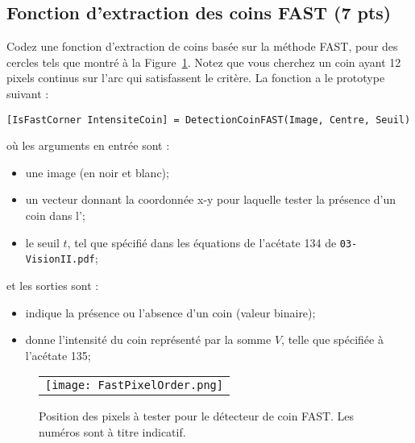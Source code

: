 \documentclass[12pt]{article}
\begin{document}
\subsection{Fonction d'extraction des coins FAST (7 pts)}
Codez une fonction d'extraction de coins basée sur la méthode FAST, pour des cercles tels que montré à la Figure~\ref{FastPixelOrder}. Notez que vous cherchez un coin ayant 12 pixels continus sur l'arc qui satisfassent le critère. La fonction a le prototype suivant :
\vspace{-0.22in}
\begin{lstlisting}
[IsFastCorner IntensiteCoin] = DetectionCoinFAST(Image, Centre, Seuil)
\end{lstlisting}
où les arguments en entrée sont :
\begin{itemize}
\item {} une image (en noir et blanc);
\item {} un vecteur donnant la coordonnée x-y pour laquelle tester la présence d'un coin dans l';
\item {} le seuil $t$, tel que spécifié dans les équations de l'acétate 134 de \texttt{03-VisionII.pdf};
\end{itemize}
et les sorties sont :
\begin{itemize}
\item {} indique la présence ou l'absence d'un coin (valeur binaire);
\item {} donne l'intensité du coin représenté par la somme $V$, telle que spécifiée à l'acétate 135;
\end{itemize}

\begin{figure}[ht]
 \begin{center}
  \begin{tabular}{c}
    \texttt{[image: FastPixelOrder.png]} 
  \end{tabular}
 \end{center}
\vspace{-0.25in}
 \caption{Position des pixels à tester pour le détecteur de coin FAST. Les numéros sont à titre indicatif.}
 \label{FastPixelOrder}
\end{figure}
\end{document}
